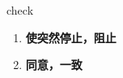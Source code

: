 
\begin{frame}
{\huge check}
\begin{center}
\begin{enumerate}\Large
  \item \textbf{使突然停止，阻止}
  \item \textbf{同意，一致}
\end{enumerate}
\end{center}
\end{frame}
